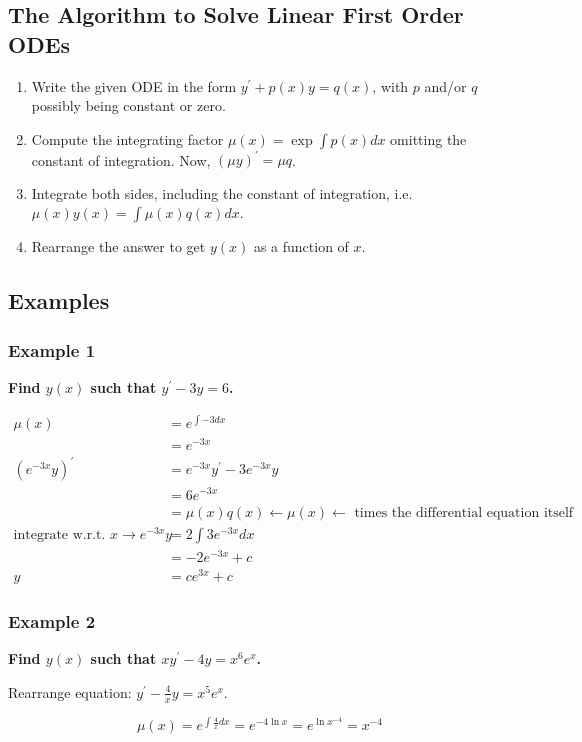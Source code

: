 \documentclass[11pt]{article}
\newcommand{\yp}{y^{\prime}}
\begin{document}
\subsection{The Algorithm to Solve Linear First Order ODEs}
	\begin{enumerate}
		\item Write the given ODE in the form $\yp + p(x) y = q(x)$, with $p$ and/or $q$ possibly being constant or zero.
		\item Compute the integrating factor $\mu(x) = \exp{\int p(x) dx}$ omitting the constant of integration. Now, $(\mu y)^{\prime} = \mu q$.
		\item Integrate both sides, including the constant of integration, i.e. $\mu(x) y(x) = \int \mu(x) q(x) dx$.
		\item Rearrange the answer to get $y(x)$ as a function of $x$.
	\end{enumerate}

\subsection{Examples}
\subsubsection{Example 1}
	\textbf{Find $y(x)$ such that $\yp - 3y = 6$.}

	\begin{align*}
		\mu(x) &= e^{\int -3 dx} \\
			&= e^{-3x} \\
		(e^{-3x} y)^{\prime} &= e^{-3x}\yp - 3 e^{-3x} y \\
			&= 6 e^{-3x} \\
			&= \mu(x)q(x) \leftarrow \mu(x) \leftarrow \text{ times the differential equation itself} \\
		\text{integrate w.r.t. } x \rightarrow e^{-3x}y &= 2 \int 3 e^{-3x} dx \\
			&= -2 e^{-3x} + c \\
		y &= c e^{3x} + c
	\end{align*}

\subsubsection{Example 2}
	\textbf{Find $y(x)$ such that $x \yp - 4 y = x^6 e^x$.}

	Rearrange equation: $\yp - \frac{4}{x} y = x^5 e^x$.

	$$ \mu(x) = e^{\int \frac{4}{x} dx} = e^{-4 \ln x} = e^{\ln{x}^{-4}} = x^{-4} $$
\end{document}
